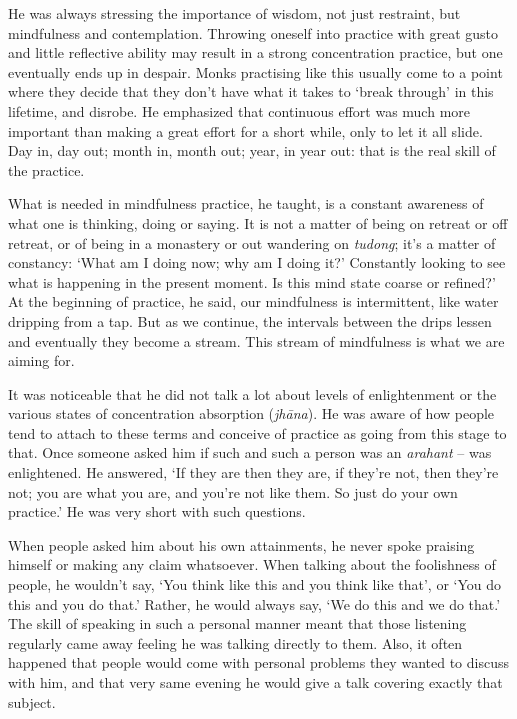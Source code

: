 He was always stressing the importance of wisdom, not just restraint, 
but mindfulness and contemplation. Throwing oneself into practice with
great gusto and little reflective ability may result in a strong
concentration practice, but one eventually ends up in despair. Monks
practising like this usually come to a point where they decide that they
don't have what it takes to `break through' in this lifetime, and
disrobe. He emphasized that continuous effort was much more important
than making a great effort for a short while, only to let it all slide. 
Day in, day out; month in, month out; year, in year out: that is the
real skill of the practice. 

What is needed in mindfulness practice, he taught, is a constant
awareness of what one is thinking, doing or saying. It is not a matter
of being on retreat or off retreat, or of being in a monastery or out
wandering on \emph{tudong}; it's a matter of constancy: `What am I doing
now; why am I doing it?' Constantly looking to see what is happening in
the present moment. Is this mind state coarse or refined?' At the
beginning of practice, he said, our mindfulness is intermittent, like
water dripping from a tap. But as we continue, the intervals between the
drips lessen and eventually they become a stream. This stream of
mindfulness is what we are aiming for. 

It was noticeable that he did not talk a lot about levels of
enlightenment or the various states of concentration absorption
 (\emph{jhāna}). He was aware of how people tend to attach to these terms
and conceive of practice as going from this stage to that. Once someone
asked him if such and such a person was an \emph{arahant} -- was
enlightened. He answered, `If they are then they are, if they're not, 
then they're not; you are what you are, and you're not like them. So
just do your own practice.' He was very short with such questions. 

When people asked him about his own attainments, he never spoke praising
himself or making any claim whatsoever. When talking about the
foolishness of people, he wouldn't say, `You think like this and you
think like that', or `You do this and you do that.' Rather, he would
always say, `We do this and we do that.' The skill of speaking in such a
personal manner meant that those listening regularly came away feeling
he was talking directly to them. Also, it often happened that people
would come with personal problems they wanted to discuss with him, and
that very same evening he would give a talk covering exactly that
subject. 

